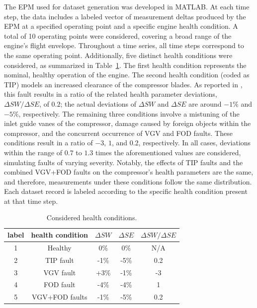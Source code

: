 \documentclass[twocolumn]{ceurart}
\begin{document}
The EPM used for dataset generation was developed in MATLAB. At each time step, the data includes a labeled vector of measurement deltas produced by the EPM at a specified operating point and a specific engine health condition. A total of 10 operating points were considered, covering a broad range of the engine’s flight envelope. Throughout a time series, all time steps correspond to the same operating point. Additionally, five distinct health conditions were considered, as summarized in Table~\ref{tab:health_conditions}. The first health condition represents the nominal, healthy operation of the engine. The second health condition (coded as TIP) models an increased clearance of the compressor blades. As reported in \citep{mathioudakis_signatures_2024}, this fault results in a ratio of the related health parameter deviations, $\Delta SW/\Delta SE$, of $0.2$; the actual deviations of $\Delta SW$ and $\Delta SE$ are around $-1\%$ and $-5\%$, respectively. The remaining three conditions involve a mistuning of the inlet guide vanes of the compressor, damage caused by foreign objects within the compressor, and the concurrent occurrence of VGV and FOD faults. These conditions result in a ratio of $-3$, $1$, and $0.2$, respectively. In all cases, deviations within the range of $0.7$ to $1.3$ times the aforementioned values are considered, simulating faults of varying severity. Notably, the effects of TIP faults and the combined VGV+FOD faults on the compressor’s health parameters are the same, and therefore, measurements under these conditions follow the same distribution. Each dataset record is labeled according to the specific health condition present at that time step.

\begin{table}[h]
\caption{Considered health conditions.}
\label{tab:health_conditions}
\centering
\begin{tabular}{ccccc} 
\toprule
label &  health condition & $\Delta SW$ & $\Delta SE$ & $\Delta SW/\Delta SE$ \\
\midrule
1	& Healthy	& 0\%	& 0\%	& N/A \\
2	& TIP fault	& -1\%	& -5\%	& 0.2 \\
3	& VGV fault	& +3\%	& -1\%	& -3 \\
4	& FOD fault	& -4\%	& -4\%	& 1 \\
5	& VGV+FOD faults	& -1\%	& -5\%	& 0.2 \\
\bottomrule
\end{tabular}
\end{table}
\end{document}
